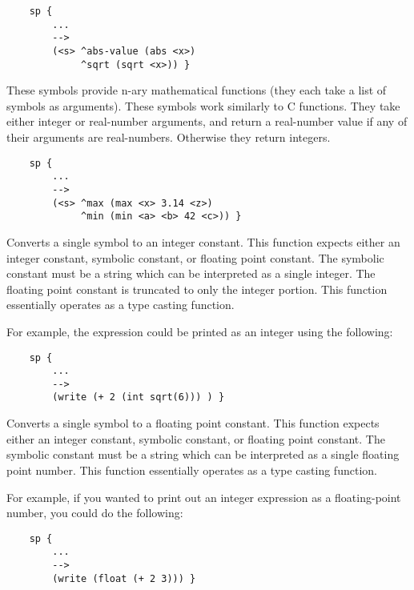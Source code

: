 \begin{description}
	\begin{verbatim}
	sp {
	    ...
	    -->
	    (<s> ^abs-value (abs <x>)
	         ^sqrt (sqrt <x>)) }
	\end{verbatim}

\item [\soarb{min, max} --- ]
	These symbols provide n-ary mathematical functions (they each take a list of symbols as arguments). These symbols work similarly to C functions. They take either integer or real-number arguments, and return a real-number value if any of their arguments are real-numbers. Otherwise they return integers.

	\begin{verbatim}
	sp {
		...
		-->
		(<s> ^max (max <x> 3.14 <z>)
		     ^min (min <a> <b> 42 <c>)) }
	\end{verbatim}


\item [\soarb{int} --- ]
	Converts a single symbol to an integer constant. This function expects either an integer constant, symbolic constant, or floating point constant. The symbolic constant must be a string which can be interpreted as a single integer. The floating point constant is truncated to only the integer portion. This function essentially operates as a type casting function.

	For example, the expression  could be printed as an integer using the following:

	\begin{verbatim}
	sp {
	    ...
	    -->
	    (write (+ 2 (int sqrt(6))) ) }
	\end{verbatim}

\item [\soarb{float} --- ]
	Converts a single symbol to a floating point constant. This function expects either an integer constant, symbolic constant, or floating point constant. The symbolic constant must be a string which can be interpreted as a single floating point number. This function essentially operates as a type casting function.

	For example, if you wanted to print out an integer expression as a floating-point number, you could do the following:

	\begin{verbatim}
	sp {
	    ...
	    -->
	    (write (float (+ 2 3))) }
	\end{verbatim}


\end{description}
